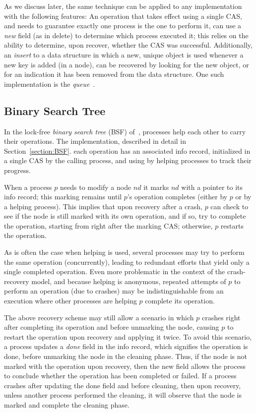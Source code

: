 {As we discuss later, the same technique can be applied to any implementation
with the following features:
An operation that takes effect using a single CAS,
and needs to guarantee exactly one process is the one to perform it,
can use a \emph{new} field (as in delete) to determine which process executed it;
this relies on the ability to determine, upon recover, whether the CAS was successful.
Additionally, an \emph{insert} to a data structure in which a new,
unique object is used whenever a new key is added (in a node),
can be recovered by looking for the new object,
or for an indication it has been removed from the data structure.
One such implementation is the \emph{queue}~\cite{MichaelS-PODC1996}.

}


\subsection*{Binary Search Tree}

In the lock-free \emph{binary search tree} (BSF)
of~\cite{DBLP:conf/podc/EllenFRB10},
processes help each other to carry their operations.
The implementation, described in detail in Section~\ref{section:BSF}.
each operation has an associated info record,
initialized in a single CAS by the calling process,
and using by helping processes to track their progress.

When a process $p$ needs to modify a node $nd$ it marks $nd$ with
a pointer to its info record; this marking remains until $p$'s operation
completes (either by $p$ or by a helping process).
This implies that upon recovery after a crash,
$p$ can check to see if the node is still marked with its own operation,
and if so, try to complete the operation, starting from right after the marking CAS;
otherwise, $p$ restarts the operation.

As is often the case when helping is used,
several processes may try to perform the same operation (concurrently),
leading to redundant efforts that yield only a single completed operation.
Even more problematic in the context of the crash-recovery model,
and because helping is anonymous,
repeated attempts of $p$ to perform an operation (due to crashes)
may be indistinguishable from an execution where other processes are helping $p$
complete its operation.

The above recovery scheme may still allow a scenario in which $p$ crashes
right after completing its operation and before unmarking the node,
causing $p$ to restart the operation upon recovery and applying it twice.
To avoid this scenario, a process updates a \emph{done} field in
the info record, which signifies the operation is done,
before unmarking the node in the cleaning phase.
Thus, if the node is not marked with the operation upon recovery,
then the new field allows the process to conclude whether
the operation has been completed or failed.
If a process crashes after updating the done field and before cleaning,
then upon recovery, unless another process performed the cleaning,
it will observe that the node is marked and complete the cleaning phase.

